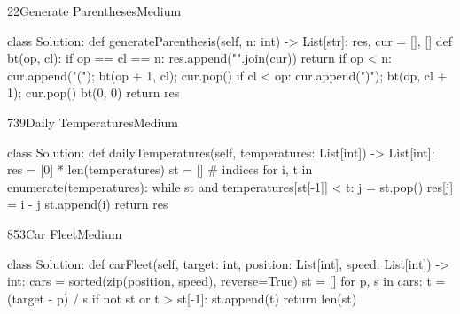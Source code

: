 \begin{problem}{22}{Generate Parentheses}{Medium}
\begin{code}
class Solution:
    def generateParenthesis(self, n: int) -> List[str]:
        res, cur = [], []
        def bt(op, cl):
            if op == cl == n:
                res.append("".join(cur))
                return
            if op < n:
                cur.append("("); bt(op + 1, cl); cur.pop()
            if cl < op:
                cur.append(")"); bt(op, cl + 1); cur.pop()
        bt(0, 0)
        return res
\end{code}
\end{problem}

\begin{problem}{739}{Daily Temperatures}{Medium}
\begin{code}
class Solution:
    def dailyTemperatures(self, temperatures: List[int]) -> List[int]:
        res = [0] * len(temperatures)
        st = []  # indices
        for i, t in enumerate(temperatures):
            while st and temperatures[st[-1]] < t:
                j = st.pop()
                res[j] = i - j
            st.append(i)
        return res
\end{code}
\end{problem}

\begin{problem}{853}{Car Fleet}{Medium}
\begin{code}
class Solution:
    def carFleet(self, target: int, position: List[int], speed: List[int]) -> int:
        cars = sorted(zip(position, speed), reverse=True)
        st = []
        for p, s in cars:
            t = (target - p) / s
            if not st or t > st[-1]:
                st.append(t)
        return len(st)
\end{code}
\end{problem}

